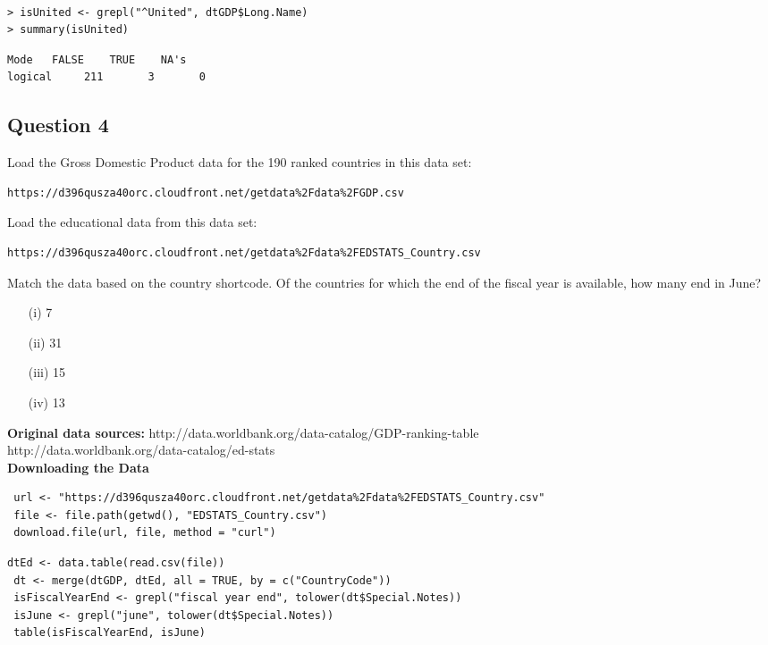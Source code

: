 \documentclass[]{article}
\begin{document}

\begin{framed}
\begin{verbatim}

> isUnited <- grepl("^United", dtGDP$Long.Name)
> summary(isUnited)
\end{verbatim}
\end{framed}
\begin{verbatim}
Mode   FALSE    TRUE    NA's 
logical     211       3       0 
\end{verbatim}
\newpage
\subsection*{Question 4}
Load the Gross Domestic Product data for the 190 ranked countries in this data set: 

\begin{verbatim}
https://d396qusza40orc.cloudfront.net/getdata%2Fdata%2FGDP.csv 
\end{verbatim}
Load the educational data from this data set: 

\begin{verbatim}
https://d396qusza40orc.cloudfront.net/getdata%2Fdata%2FEDSTATS_Country.csv 
\end{verbatim}
Match the data based on the country shortcode. Of the countries for which the end of the fiscal year is available, how many end in June? 

\begin{itemize}
\item[(i)] 7
\item[(ii)] 31
\item[(iii)] 15
\item[(iv)] 13
\end{itemize}

\noindent \textbf{Original data sources: }
http://data.worldbank.org/data-catalog/GDP-ranking-table \\
http://data.worldbank.org/data-catalog/ed-stats \\

\noindent \textbf{
Downloading the Data}
\begin{framed}
\begin{verbatim}
 url <- "https://d396qusza40orc.cloudfront.net/getdata%2Fdata%2FEDSTATS_Country.csv"
 file <- file.path(getwd(), "EDSTATS_Country.csv")
 download.file(url, file, method = "curl")
\end{verbatim}
\end{framed}
\begin{framed}
\begin{verbatim}
dtEd <- data.table(read.csv(file))
 dt <- merge(dtGDP, dtEd, all = TRUE, by = c("CountryCode"))
 isFiscalYearEnd <- grepl("fiscal year end", tolower(dt$Special.Notes))
 isJune <- grepl("june", tolower(dt$Special.Notes))
 table(isFiscalYearEnd, isJune)
\end{verbatim}
\end{framed}
\newpage
\end{document}
